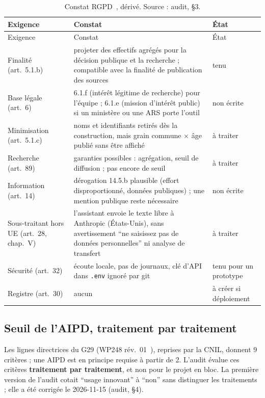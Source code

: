 \begin{small}
\begin{longtable}{@{}p{}p{}p{}@{}}
\caption{Constat RGPD~\citep{e-rgpd}, dérivé. Source : audit, §3.}\label{conf:tab-rgpd}\\
\toprule Exigence & Constat & État \\ \midrule\endfirsthead
\toprule Exigence & Constat & État \\ \midrule\endhead
\bottomrule\endfoot
Finalité (art.~5.1.b) & projeter des effectifs agrégés pour la décision publique et la recherche ; compatible avec la finalité de publication des sources & tenu \\
Base légale (art.~6) & 6.1.f (intérêt légitime de recherche) pour l'équipe ; 6.1.e (mission d'intérêt public) si un ministère ou une ARS porte l'outil & non écrite \\
Minimisation (art.~5.1.c) & noms et identifiants retirés dès la construction, mais grain commune $\times$ âge publié sans être affiché & à traiter \\
Recherche (art.~89) & garanties possibles : agrégation, seuil de diffusion ; pas encore de seuil & à traiter \\
Information (art.~14) & dérogation 14.5.b plausible (effort disproportionné, données publiques) ; une mention publique reste nécessaire & non écrite \\
Sous-traitant hors UE (art.~28, chap.~V) & l'assistant envoie le texte libre à Anthropic (États-Unis), sans avertissement \enquote{ne saisissez pas de données personnelles} ni analyse de transfert & à traiter \\
Sécurité (art.~32) & écoute locale, pas de journaux, clé d'API dans \texttt{.env} ignoré par git & tenu pour un prototype \\
Registre (art.~30) & aucun & à créer si déploiement \\
\end{longtable}
\end{small}

\subsection{Seuil de l'AIPD, traitement par traitement}\label{conf:aipd}

Les lignes directrices du G29 (WP248 rév.~01~\citep{e-wp248}), reprises par la CNIL, donnent 9\mesure{} critères ; une AIPD est en principe requise à partir de 2\mesure{}.
L'audit évalue ces critères \textbf{traitement par traitement}, et non pour le projet en bloc.
La première version de l'audit cotait \enquote{usage innovant} à \enquote{non} sans distinguer les traitements ; elle a été corrigée le 2026-11-15 (audit, §4).

